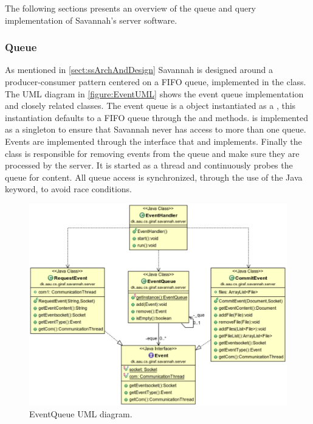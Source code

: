 The following sections presents an overview of the queue and query implementation of Savannah's server software.
\subsubsection{Queue}

As mentioned in \autoref{sect:ssArchAndDesign} Savannah is designed around a producer-consumer pattern centered on a FIFO queue, implemented in the  class.
The UML diagram in \autoref{figure:EventUML} shows the event queue implementation and closely related classes.
The event queue is a  object instantiated as a , this instantiation defaults to a FIFO queue through
the  and  methods.  is implemented as a singleton to ensure that Savannah never has access to more than one queue.
Events are implemented through the  interface that  and  implements.
Finally the  class is responsible for removing events from the queue and make sure they are processed by the server. It is started as a thread and
continuously probes the queue for content. All queue access is synchronized, through the use of the Java  keyword, to avoid race conditions.

\begin{figure}[H]
 \centering
  \includegraphics[scale=0.65]{images/EventQueue}
  \caption{EventQueue UML diagram.}
  \label{figure:EventUML}
\end{figure}

